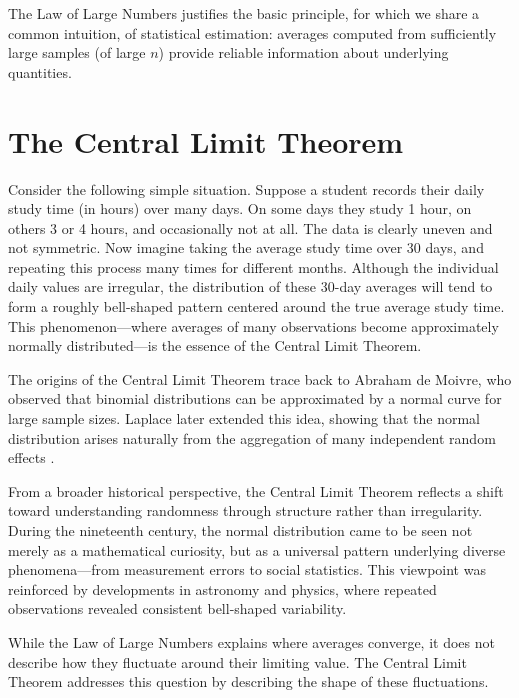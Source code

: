 \medskip

The Law of Large Numbers justifies the basic principle, for which we share a common intuition, of statistical estimation: averages computed from sufficiently large samples (of large $n$) provide reliable information about underlying quantities.

\section{The Central Limit Theorem}

Consider the following simple situation. Suppose a student records their daily study time (in hours) over many days. On some days they study 1 hour, on others 3 or 4 hours, and occasionally not at all. The data is clearly uneven and not symmetric. Now imagine taking the average study time over 30 days, and repeating this process many times for different months. Although the individual daily values are irregular, the distribution of these 30-day averages will tend to form a roughly bell-shaped pattern centered around the true average study time. This phenomenon—where averages of many observations become approximately normally distributed—is the essence of the Central Limit Theorem.

\medskip

The origins of the Central Limit Theorem trace back to Abraham de Moivre, who observed that binomial distributions can be approximated by a normal curve for large sample sizes. Laplace later extended this idea, showing that the normal distribution arises naturally from the aggregation of many independent random effects \cite{laplace_1812_theorie, stigler_1986_history}.

\medskip

From a broader historical perspective, the Central Limit Theorem reflects a shift toward understanding randomness through structure rather than irregularity. During the nineteenth century, the normal distribution came to be seen not merely as a mathematical curiosity, but as a universal pattern underlying diverse phenomena—from measurement errors to social statistics. This viewpoint was reinforced by developments in astronomy and physics, where repeated observations revealed consistent bell-shaped variability.

\medskip

While the Law of Large Numbers explains where averages converge, it does not describe how they fluctuate around their limiting value. The Central Limit Theorem addresses this question by describing the shape of these fluctuations.

